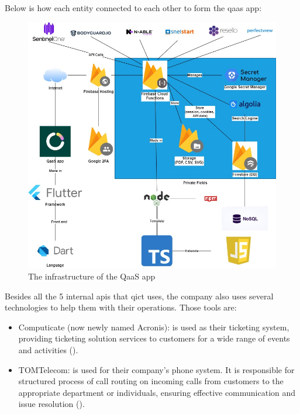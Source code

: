 Below is how each entity connected to each other to form the \acrshort{qaas} app:

\begin{figure}[H]
      \centering
      \includegraphics[width=1.0\textwidth]{Figures/QaaS App Infraastructure.jpg}
      \caption{The infrastructure of the QaaS app}
\end{figure}

Besides all the 5 internal \acrshort{api}s that \acrshort{qict} uses, the company also uses several technologies to help them with their
operations. Those tools are:

\begin{itemize}
      \item Computicate (now newly named Acronis): is used as their ticketing system, providing ticketing solution services to customers for
            a wide range of events and activities (\textit{\cite{computicate}}).
      \item TOMTelecom: is used for their company's phone system. It is responsible for structured process of call routing on incoming calls
            from customers to the appropriate department or individuals, ensuring effective communication and issue resolution
            (\textit{\cite{tomTelecom}}).
\end{itemize}

